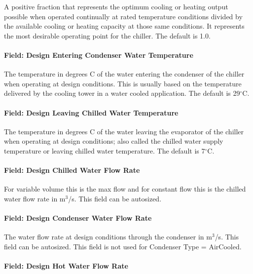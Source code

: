A positive fraction that represents the optimum cooling or heating output possible when operated continually at rated temperature conditions divided by the available cooling or heating capacity at those same conditions. It represents the most desirable operating point for the chiller. The default is 1.0.

\paragraph{Field: Design Entering Condenser Water Temperature}\label{field-design-entering-condenser-water-temperature-1}

The temperature in degrees C of the water entering the condenser of the chiller when operating at design conditions. This is usually based on the temperature delivered by the cooling tower in a water cooled application. The default is 29$^\circ$C.

\paragraph{Field: Design Leaving Chilled Water Temperature}\label{field-design-leaving-chilled-water-temperature-1}

The temperature in degrees C of the water leaving the evaporator of the chiller when operating at design conditions; also called the chilled water supply temperature or leaving chilled water temperature. The default is 7$^\circ$C.

\paragraph{Field: Design Chilled Water Flow Rate}\label{field-design-chilled-water-flow-rate-7}

For variable volume this is the max flow and for constant flow this is the chilled water flow rate in m\(^{3}\)/s. This field can be autosized.

\paragraph{Field: Design Condenser Water Flow Rate}\label{field-design-condenser-water-flow-rate-6}

The water flow rate at design conditions through the condenser in m\(^{3}\)/s. This field can be autosized. This field is not used for Condenser Type = AirCooled.

\paragraph{Field: Design Hot Water Flow Rate}\label{field-design-hot-water-flow-rate-1}

